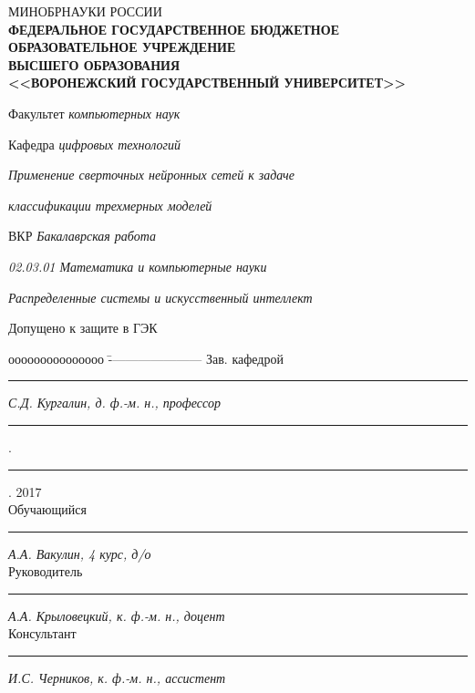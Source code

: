 \documentclass[14pt]{article}
\numberwithin{figure}{section}
\numberwithin{equation}{section}
\begin{document}
{\sffamily

\begin{titlepage}

\thispagestyle{empty}

\center

{\small МИНОБРНАУКИ РОССИИ}\\  \!  \!  \!
{\footnotesize \textbf{ФЕДЕРАЛЬНОЕ ГОСУДАРСТВЕННОЕ БЮДЖЕТНОЕ ОБРАЗОВАТЕЛЬНОЕ УЧРЕЖДЕНИЕ}}\\ \!  \!  \!
{\footnotesize  \textbf{ВЫСШЕГО ОБРАЗОВАНИЯ}}\\ \!  \!
{\small \textbf{<<ВОРОНЕЖСКИЙ ГОСУДАРСТВЕННЫЙ УНИВЕРСИТЕТ>>}}\\ \!  \!

\vspace{0.5cm}

{\small

    \centerline{Факультет \emph{компьютерных наук}}
    \vspace{0.3cm}
    \centerline{Кафедра \emph{цифровых технологий}}

    \vspace{1.5cm}

    \centerline{\emph{Применение сверточных нейронных сетей к задаче }}
    \centerline{\emph{классификации трехмерных моделей}}

    \vspace{1cm}

    \centerline{ВКР \emph{Бакалаврская работа}}
    \centerline{\emph{02.03.01 Математика и компьютерные науки}}
    \centerline{\emph{Распределенные системы и искусственный интеллект}}

    \vfill
    \begin{flushleft}
    \raggedright{Допущено к защите в ГЭК}
    \end{flushleft}
    \begin{tabbing}
    ооооооооооооооо	\=	----------------------	\kill
    Зав. кафедрой	\> 	\rule[0mm]{4cm}{0,3mm}	\emph{С.Д. Кургалин, д. ф.-м. н., профессор } \rule[0mm]{5mm}{0,3mm} . \rule[0mm]{5mm}{0,3mm} . 2017\\
    Обучающийся 	\> 	\rule[0mm]{4cm}{0,3mm}	\emph{А.А. Вакулин, 4 курс, д/о}             \\
    Руководитель	\> 	\rule[0mm]{4cm}{0,3mm}  \emph{А.А. Крыловецкий, к. ф.-м. н., доцент} \\
    Консультант 	\> 	\rule[0mm]{4cm}{0,3mm}  \emph{И.С. Черников, к. ф.-м. н., ассистент}
    \end{tabbing}

}
\end{titlepage}}
\end{document}

